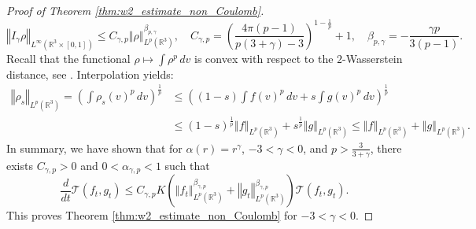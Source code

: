 \documentclass[11pt]{amsart}
\numberwithin{equation}{section}
\begin{document}
\begin{proof}[Proof of Theorem \ref{thm:w2_estimate_non_Coulomb}]
%
\begin{equation*}
  \left\Vert I_{\gamma}\rho\right\Vert _{L^{\infty}\left(\mathbb{R}^{3}\times[0,1]\right)}\leq C_{\gamma,p}\left\Vert \rho\right\Vert _{L^{p}(\mathbb{R}^{3})}^{\beta_{p,\gamma}},\quad C_{\gamma,p}=\left(\frac{4\pi(p-1)}{p(3+\gamma)-3}\right)^{1-\frac{1}{p}}+1,\quad\beta_{p,\gamma}=-\frac{\gamma p}{3(p-1)}.
\end{equation*}
%
Recall that the functional $\rho\mapsto\int\rho^{p}\,dv$ is convex with respect to the $2$-Wasserstein distance, see \cite{mccann1997convexity}. Interpolation yields:
  \begin{align*}
     \left\Vert \rho_{s}\right\Vert _{L^{p}(\mathbb{R}^{3})}=\left(\int\rho_{s}(v)^{p}\,dv\right)^{\frac{1}{p}} &
     \leq\left((1-s)\int f(v)^{p}\,dv+s\int g(v)^{p}\,dv\right)^{\frac{1}{p}}	\\
    & \leq(1-s)^{\frac{1}{p}}\left\Vert f\right\Vert _{L^{p}(\mathbb{R}^{3})}+s^{\frac{1}{p}}\left\Vert g\right\Vert _{L^{p}(\mathbb{R}^{3})}\leq\left\Vert f\right\Vert _{L^{p}(\mathbb{R}^{3})}+\left\Vert g\right\Vert _{L^{p}(\mathbb{R}^{3})}.
  \end{align*}
% 
In summary, we have shown that for $\alpha(r)=r^{\gamma}$, $-3<\gamma <0$, and $p>\frac{3}{3+\gamma}$, there exists $C_{\gamma,p}>0$ and $0<\alpha_{\gamma,p}<1$ such that
%
\begin{equation*}
  \frac{d}{dt}\mathcal{T}(f_t,g_t) \leq C_{\gamma,p}K \left(\left\Vert f_{t}\right\Vert _{L^{p}(\mathbb{R}^{3})}^{\beta_{\gamma,p}}+\left\Vert g_{t}\right\Vert _{L^{p}(\mathbb{R}^{3})}^{\beta_{\gamma,p}}\right) \mathcal{T}(f_t,g_t).
\end{equation*}
%
This proves Theorem \ref{thm:w2_estimate_non_Coulomb} for  $-3<\gamma<0$.


\end{proof}
\end{document}
